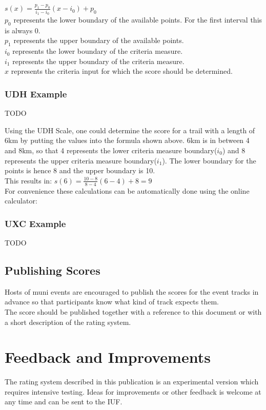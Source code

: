 \documentclass[a4paper,oneside]{scrartcl}
\begin{document}
$s(x) = \frac{p_1 - p_0}{i_1 - i_0} (x - i_0) + p_0$\\
%
$p_0$ represents the lower boundary of the available points. For the first interval this is always 0.\\
$p_1$ represents the upper boundary of the available points.\\
$i_0$ represents the lower boundary of the criteria measure.\\
$i_1$ represents the upper boundary of the criteria measure.\\
$x$ represents the criteria input for which the score should be determined.\\



\subsubsection{UDH Example}
TODO%

Using the UDH Scale, one could determine the score for a trail with a length of
6km by putting the values into the formula shown above. 6km is in between 4 and
8km, so that 4 represents the lower criteria measure boundary($i_0$) and 8
represents the upper criteria measure boundary($i_1$). The lower boundary for
the points is hence 8 and the upper boundary is 10.\\
This results in: $s(6) = \frac{10 - 8}{8 - 4} (6 - 4) + 8 = 9$\\

For convenience these calculations can be automatically done using the
online calculator: %

\subsubsection{UXC Example}
TODO



\subsection{Publishing Scores}
Hosts of muni events are encouraged to publish the scores for the event tracks
in advance so that participants know what kind of track expects them.\\ The
score should be published together with a reference to this document or with a
short description of the rating system.

\section{Feedback and Improvements}
The rating system described in this publication is an experimental version which
requires intensive testing. Ideas for improvements or other feedback is welcome
at any time and can be sent to the IUF.
\end{document}
